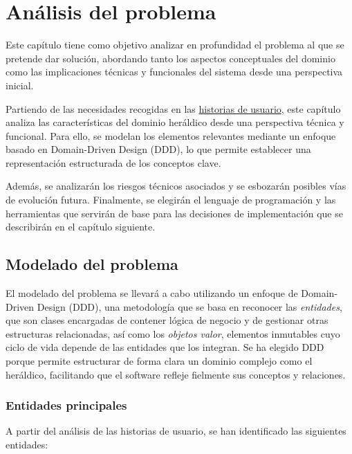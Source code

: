 \chapter{Análisis del problema}
Este capítulo tiene como objetivo analizar en profundidad el problema al que se pretende 
dar solución, abordando tanto los aspectos conceptuales del dominio como las implicaciones 
técnicas y funcionales del sistema desde una perspectiva inicial.

Partiendo de las necesidades recogidas en las \hyperref[sec:historias_usuario]{historias de usuario}, 
este capítulo analiza las características del dominio heráldico desde una perspectiva 
técnica y funcional. Para ello, se modelan los elementos relevantes mediante un enfoque 
basado en Domain-Driven Design (DDD), lo que permite establecer una representación 
estructurada de los conceptos clave.

Además, se analizarán los riesgos técnicos asociados y se esbozarán posibles vías de 
evolución futura. Finalmente, se elegirán el lenguaje de programación y las herramientas
que servirán de base para las decisiones de implementación que se describirán en el capítulo 
siguiente.

\section{Modelado del problema}
El modelado del problema se llevará a cabo utilizando un enfoque de Domain-Driven Design (DDD),
una metodología que se basa en reconocer las \textit{entidades}, que son clases encargadas de 
contener lógica de negocio y de gestionar otras estructuras relacionadas, así como los 
\textit{objetos valor}, elementos inmutables cuyo ciclo de vida depende de las entidades que 
los integran.
Se ha elegido DDD porque permite estructurar de forma clara un dominio complejo como el heráldico, 
facilitando que el software refleje fielmente sus conceptos y relaciones.

\subsection{Entidades principales}
A partir del análisis de las historias de usuario, se han identificado las siguientes entidades:

